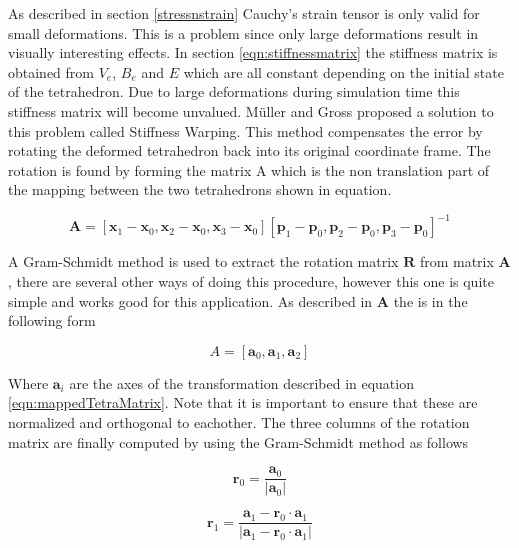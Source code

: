 As described in section \ref{stressnstrain} Cauchy’s strain tensor is only valid for small deformations. This is a problem since only large deformations result in visually interesting effects. In section \ref{eqn:stiffnessmatrix} the stiffness matrix is obtained from $V_{e}$, $B_{e}$ and $E$ which are all constant depending on the initial state of the tetrahedron. Due to large deformations during simulation time this stiffness matrix will become unvalued. M\"uller and Gross \cite{muller_ivm} proposed a solution to this problem called Stiffness Warping. This method compensates the error by rotating the deformed tetrahedron back into its original coordinate frame. The rotation is found by forming the matrix A which is the non translation part of the mapping between the two tetrahedrons shown in equation.

\begin{equation}\label{eqn:mappedTetraMatrix}
    \mathbf{A} = [\mathbf{x}_{1}-\mathbf{x}_{0}, \mathbf{x}_{2}-\mathbf{x}_{0}, \mathbf{x}_{3}-\mathbf{x}_{0}][\mathbf{p}_{1}-\mathbf{p}_{0}, \mathbf{p}_{2}-\mathbf{p}_{0}, \mathbf{p}_{3}-\mathbf{p}_{0}]^{-1}
\end{equation}

A Gram-Schmidt method is used to extract the rotation matrix $\mathbf{R}$  from matrix $\mathbf{A}$ , there are several other ways of doing this procedure, however this one is quite simple and works good for this application. As described in \cite{rt_phys} $\mathbf{A}$ the is in the following form

\begin{equation}\label{eqn:transformationAxes}
    A =[\mathbf{a}_0, \mathbf{a}_1,\mathbf{a}_2]
\end{equation}

Where $\mathbf{a}_i$ are the axes of the transformation described in equation \ref{eqn:mappedTetraMatrix}. Note that it is important to ensure that these are normalized and orthogonal to eachother. The three columns of the rotation matrix are finally computed by using the Gram-Schmidt method as follows

\begin{equation}\label{eqn:r0}
    \mathbf{r}_0 = \frac{\mathbf{a}_0}{| \mathbf{a}_0 |}
\end{equation}

\begin{equation}\label{eqn:r1}
    \mathbf{r}_1 = \frac{\mathbf{a}_1 -  \mathbf{r}_0 \cdot \mathbf{a}_1}{| \mathbf{a}_1 -  \mathbf{r}_0 \cdot \mathbf{a}_1 |}
\end{equation}

